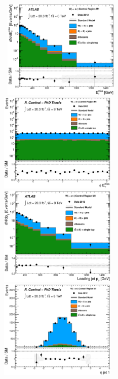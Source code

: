 \begin{figure}[!ht]
  \begin{center}
    \mbox{
      \includegraphics[width=0.495\textwidth]{MonojetAnalysis/Figures/plot_Stop_A6_CRele_met_fitted.eps}
      \includegraphics[width=0.495\textwidth]{MonojetAnalysis/Figures/plot_Stop_A6_CRele_met_phi_fitted.eps}
    }
    \mbox{
      \includegraphics[width=0.495\textwidth]{MonojetAnalysis/Figures/plot_Stop_A6_CRele_pt1_fitted.eps}
      \includegraphics[width=0.495\textwidth]{MonojetAnalysis/Figures/plot_Stop_A6_CRele_eta1_fitted.eps}
}
\end{center}
\end{figure}
